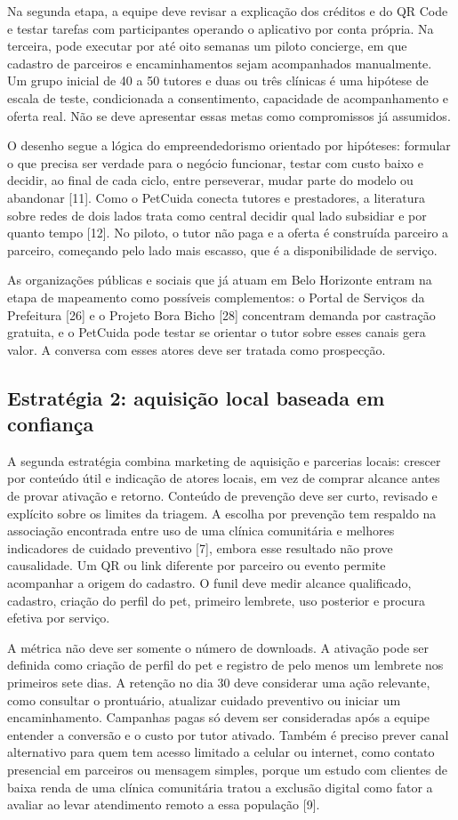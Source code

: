 \documentclass[12pt,a4paper]{article}
\begin{document}
Na segunda etapa, a equipe deve revisar a explicação dos créditos e do QR Code e testar tarefas com participantes operando o aplicativo por conta própria. Na terceira, pode executar por até oito semanas um piloto concierge, em que cadastro de parceiros e encaminhamentos sejam acompanhados manualmente. Um grupo inicial de 40 a 50 tutores e duas ou três clínicas é uma hipótese de escala de teste, condicionada a consentimento, capacidade de acompanhamento e oferta real. Não se deve apresentar essas metas como compromissos já assumidos.

O desenho segue a lógica do empreendedorismo orientado por hipóteses: formular o que precisa ser verdade para o negócio funcionar, testar com custo baixo e decidir, ao final de cada ciclo, entre perseverar, mudar parte do modelo ou abandonar [11]. Como o PetCuida conecta tutores e prestadores, a literatura sobre redes de dois lados trata como central decidir qual lado subsidiar e por quanto tempo [12]. No piloto, o tutor não paga e a oferta é construída parceiro a parceiro, começando pelo lado mais escasso, que é a disponibilidade de serviço.

As organizações públicas e sociais que já atuam em Belo Horizonte entram na etapa de mapeamento como possíveis complementos: o Portal de Serviços da Prefeitura [26] e o Projeto Bora Bicho [28] concentram demanda por castração gratuita, e o PetCuida pode testar se orientar o tutor sobre esses canais gera valor. A conversa com esses atores deve ser tratada como prospecção.

\subsection{Estratégia 2: aquisição local baseada em confiança}

A segunda estratégia combina marketing de aquisição e parcerias locais: crescer por conteúdo útil e indicação de atores locais, em vez de comprar alcance antes de provar ativação e retorno. Conteúdo de prevenção deve ser curto, revisado e explícito sobre os limites da triagem. A escolha por prevenção tem respaldo na associação encontrada entre uso de uma clínica comunitária e melhores indicadores de cuidado preventivo [7], embora esse resultado não prove causalidade. Um QR ou link diferente por parceiro ou evento permite acompanhar a origem do cadastro. O funil deve medir alcance qualificado, cadastro, criação do perfil do pet, primeiro lembrete, uso posterior e procura efetiva por serviço.

A métrica não deve ser somente o número de downloads. A ativação pode ser definida como criação de perfil do pet e registro de pelo menos um lembrete nos primeiros sete dias. A retenção no dia 30 deve considerar uma ação relevante, como consultar o prontuário, atualizar cuidado preventivo ou iniciar um encaminhamento. Campanhas pagas só devem ser consideradas após a equipe entender a conversão e o custo por tutor ativado. Também é preciso prever canal alternativo para quem tem acesso limitado a celular ou internet, como contato presencial em parceiros ou mensagem simples, porque um estudo com clientes de baixa renda de uma clínica comunitária tratou a exclusão digital como fator a avaliar ao levar atendimento remoto a essa população [9].
\end{document}
